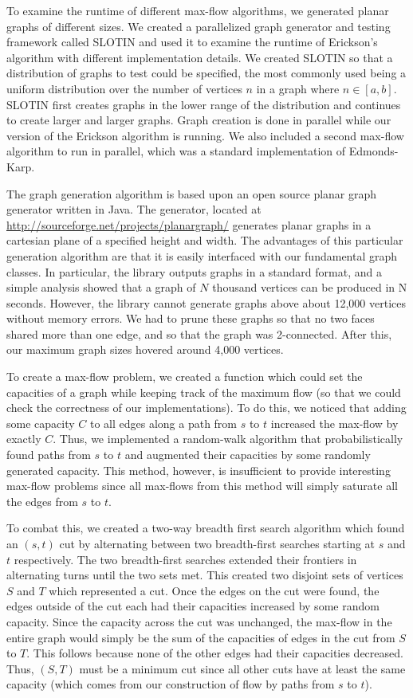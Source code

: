 \documentclass[12pt]{article}
\begin{document}
To examine the runtime of different max-flow algorithms, we generated planar graphs of different sizes. We created a parallelized graph generator and testing framework called SLOTIN and used it to examine the runtime of Erickson's algorithm with different implementation details. We created SLOTIN so that a distribution of graphs to test could be specified, the most commonly used being a uniform distribution over the number of vertices $n$ in a graph where $n \in [a,b]$. SLOTIN first creates graphs in the lower range of the distribution and continues to create larger and larger graphs. Graph creation is done in parallel while our version of the Erickson algorithm is running. We also included a second max-flow algorithm to run in parallel, which was a standard implementation of Edmonds-Karp. 

The graph generation algorithm is based upon an open source planar graph generator written in Java. The generator, located at \url{http://sourceforge.net/projects/planargraph/} generates planar graphs in a cartesian plane of a specified height and width. The advantages of this particular generation algorithm are that it is easily interfaced with our fundamental graph classes. In particular, the library outputs graphs in a standard format, and a simple analysis showed that a graph of $N$ thousand vertices can be produced in N seconds. However, the library cannot generate graphs above about 12,000 vertices without memory errors.  We had to prune these graphs so that no two faces shared more than one edge, and so that the graph was 2-connected.  After this, our maximum graph sizes hovered around 4,000 vertices.

To create a max-flow problem, we created a function which could set the capacities of a graph while keeping track of the maximum flow (so that we could check the correctness of our implementations). To do this, we noticed that adding some capacity $C$ to all edges along a path from $s$ to $t$ increased the max-flow by exactly $C$. Thus, we implemented a random-walk algorithm that probabilistically found paths from $s$ to $t$ and augmented their capacities by some randomly generated capacity. This method, however, is insufficient to provide interesting max-flow problems since all max-flows from this method will simply saturate all the edges from $s$ to $t$. 

To combat this, we created a two-way breadth first search algorithm which found an $(s,t)$ cut by alternating between two breadth-first searches starting at $s$ and $t$ respectively. The two breadth-first searches extended their frontiers in alternating turns until the two sets met. This created two disjoint sets of vertices $S$ and $T$ which represented a cut. Once the edges on the cut were found, the edges outside of the cut each had their capacities increased by some random capacity. Since the capacity across the cut was unchanged, the max-flow in the entire graph would simply be the sum of the capacities of edges in the cut from $S$ to $T$. This follows because none of the other edges had their capacities decreased. Thus, $(S,T)$ must be a minimum cut since all other cuts have at least the same capacity (which comes from our construction of flow by paths from $s$ to $t$). 
\end{document}
